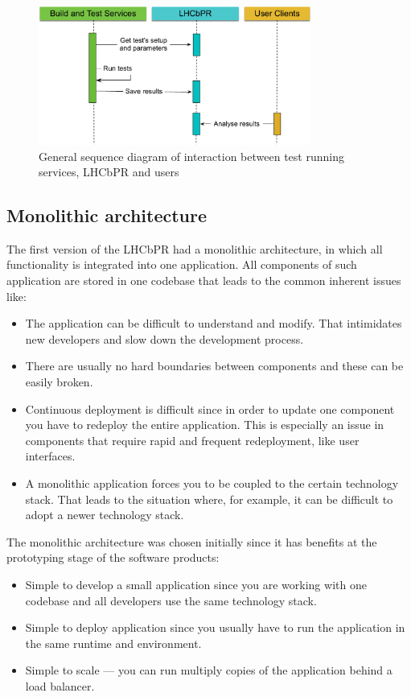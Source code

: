 \documentclass[a4paper]{jpconf}
\begin{document}
\begin{figure}[H]
\begin{minipage}{\textwidth}
\centering
\includegraphics[width=0.8\textwidth]{figs/lhcbpr-general.pdf}
\caption{\label{fig01} General sequence diagram of interaction between test
running services, LHCbPR and users}
\end{minipage}
\end{figure}

\subsection{Monolithic architecture}
The first version of the LHCbPR had a monolithic architecture, in which all
functionality is integrated into one application. All components of
such application are stored in one codebase that leads to the common inherent
issues like:
\begin{itemize}
\item The application can be difficult to understand and modify. That
intimidates new developers and slow down the development process.
\item There are usually no hard boundaries between components and these can be
easily broken.
\item Continuous deployment is difficult since in order to update one component
you have to redeploy the entire application. This is especially an issue in
components that require rapid and frequent redeployment, like user interfaces.
\item A monolithic application forces you to be coupled to the certain
technology stack. That leads to the situation where, for example, it can be
difficult to adopt a newer technology stack.
\end{itemize}

The monolithic architecture was chosen initially since it has benefits at the
prototyping stage of the software products:
\begin{itemize}
\item Simple to develop a small application since you are working with one codebase
and all developers use the same technology stack.  
\item Simple to deploy application since you usually have to run the application in the same
runtime and environment.
\item Simple to scale --- you can run multiply copies of the application behind a
load balancer.
\end{itemize}
\end{document}

